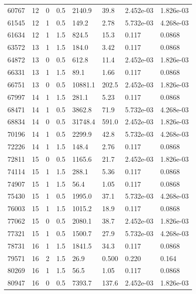 \documentclass[preview]{standalone}
\begin{document}
{{{\begin{tabular}{L{1.2cm}C{1.2cm} C{0.3cm}C{0.5cm} C{1.4cm}C{1.4cm} C{1.4cm}C{1.4cm}}
  60767  &    12  & 0     & 0.5 &  2140.9  & 39.8  & 2.452e-03 &  1.826e-03   \\ 
  61545  &    12  & 1     & 0.5 &  149.2  & 2.78  & 5.732e-03 &  4.268e-03   \\ 
  61634  &    12  & 1     & 1.5 &  824.5  & 15.3  & 0.117 &  0.0868   \\ 
  63572  &    13  & 1     & 1.5 &  184.0  & 3.42  & 0.117 &  0.0868   \\ 
  64872  &    13  & 0     & 0.5 &  612.8  & 11.4  & 2.452e-03 &  1.826e-03   \\ 
  66331  &    13  & 1     & 1.5 &  89.1  & 1.66  & 0.117 &  0.0868   \\ 
  66751  &    13  & 0     & 0.5 &  10881.1  & 202.5  & 2.452e-03 &  1.826e-03   \\ 
  67997  &    14  & 1     & 1.5 &  281.1  & 5.23  & 0.117 &  0.0868   \\ 
  68471  &    14  & 1     & 0.5 &  3862.8  & 71.9  & 5.732e-03 &  4.268e-03   \\ 
  68834  &    14  & 0     & 0.5 &  31748.4  & 591.0  & 2.452e-03 &  1.826e-03   \\ 
  70196  &    14  & 1     & 0.5 &  2299.9  & 42.8  & 5.732e-03 &  4.268e-03   \\ 
  72226  &    14  & 1     & 1.5 &  148.4  & 2.76  & 0.117 &  0.0868   \\ 
  72811  &    15  & 0     & 0.5 &  1165.6  & 21.7  & 2.452e-03 &  1.826e-03   \\ 
  74114  &    15  & 1     & 1.5 &  288.1  & 5.36  & 0.117 &  0.0868   \\ 
  74907  &    15  & 1     & 1.5 &  56.4  & 1.05  & 0.117 &  0.0868   \\ 
  75430  &    15  & 1     & 0.5 &  1995.0  & 37.1  & 5.732e-03 &  4.268e-03   \\ 
  76003  &    15  & 1     & 1.5 &  1015.2  & 18.9  & 0.117 &  0.0868   \\ 
  77062  &    15  & 0     & 0.5 &  2080.1  & 38.7  & 2.452e-03 &  1.826e-03   \\ 
  77321  &    15  & 1     & 0.5 &  1500.7  & 27.9  & 5.732e-03 &  4.268e-03   \\ 
  78731  &    16  & 1     & 1.5 &  1841.5  & 34.3  & 0.117 &  0.0868   \\ 
  79571  &    16  & 2     & 1.5 &  26.9  & 0.500  & 0.220 &  0.164   \\ 
  80269  &    16  & 1     & 1.5 &  56.5  & 1.05  & 0.117 &  0.0868   \\ 
  80947  &    16  & 0     & 0.5 &  7393.7  & 137.6  & 2.452e-03 &  1.826e-03   \\ 

\end{tabular}}}}
\end{document}
